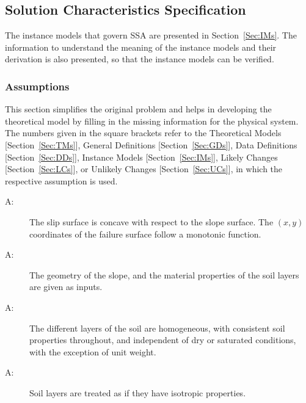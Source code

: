 \documentclass[12pt]{article}
\newcounter{assumpnum}
\newcommand{\atheassumpnum}{A\theassumpnum}
\begin{document}
\subsection{Solution Characteristics Specification}
\label{Sec:SolCharSpec}
The instance models that govern SSA are presented in Section~\ref{Sec:IMs}. The information to understand the meaning of the instance models and their derivation is also presented, so that the instance models can be verified.
\subsubsection{Assumptions}
\label{Sec:Assumps}
This section simplifies the original problem and helps in developing the theoretical model by filling in the missing information for the physical system. The numbers given in the square brackets refer to the Theoretical Models {[}Section~\ref{Sec:TMs}{]}, General Definitions {[}Section~\ref{Sec:GDs}{]}, Data Definitions {[}Section~\ref{Sec:DDs}{]}, Instance Models {[}Section~\ref{Sec:IMs}{]}, Likely Changes {[}Section~\ref{Sec:LCs}{]}, or Unlikely Changes {[}Section~\ref{Sec:UCs}{]}, in which the respective assumption is used.
\begin{description}
\item[\atheassumpnum\label{A:Slip-Surface-Concave}:]The slip surface is concave with respect to the slope surface. The $(x,y)$ coordinates of the failure surface follow a monotonic function.
\end{description}
\begin{description}
\item[\atheassumpnum\label{A:Geo-Slope-Mat-Props-of-Soil-Inputs}:]The geometry of the slope, and the material properties of the soil layers are given as inputs.
\end{description}
\begin{description}
\item[\atheassumpnum\label{A:Soil-Layer-Homogeneous}:]The different layers of the soil are homogeneous, with consistent soil properties throughout, and independent of dry or saturated conditions, with the exception of unit weight.
\end{description}
\begin{description}
\item[\atheassumpnum\label{A:Soil-Layers-Isotropic}:]Soil layers are treated as if they have isotropic properties.
\end{description}
\end{document}
